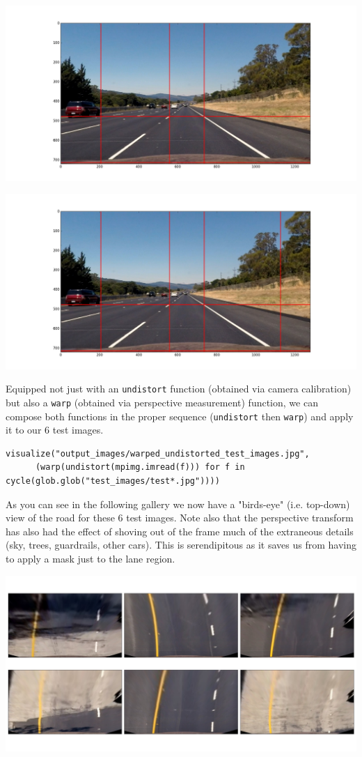 \documentclass[11pt]{article}
\begin{document}
\includegraphics[width=.9\linewidth]{output_images/figure_3-3.png}

\includegraphics[width=.9\linewidth]{output_images/figure_3-4.png}

Equipped not just with an \texttt{undistort} function (obtained via
camera calibration) but also a \texttt{warp} (obtained via
perspective measurement) function, we can compose both functions
in the proper sequence (\texttt{undistort} then \texttt{warp}) and apply it to
our 6 test images.

\begin{verbatim}
visualize("output_images/warped_undistorted_test_images.jpg",
	  (warp(undistort(mpimg.imread(f))) for f in cycle(glob.glob("test_images/test*.jpg"))))
\end{verbatim}

As you can see in the following gallery we now have a
"birds-eye" (i.e. top-down) view of the road for these 6 test
images.  Note also that the perspective transform has also had
the effect of shoving out of the frame much of the extraneous
details (sky, trees, guardrails, other cars).  This is
serendipitous as it saves us from having to apply a mask just to
the lane region.  

\includegraphics[width=.9\linewidth]{output_images/warped_undistorted_test_images.jpg}
\end{document}
